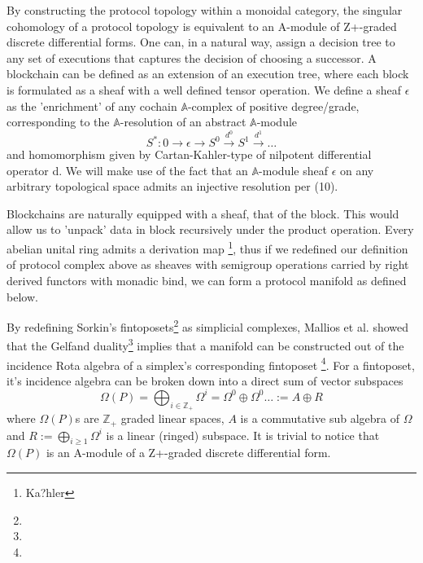 \documentclass{article}
\begin{document}
By constructing the protocol topology within a monoidal category, the singular cohomology of a protocol topology is equivalent to an A-module of Z+-graded discrete differential forms. One can, in a natural way, assign a decision tree to any set of executions that captures the decision of choosing a successor. A blockchain can be defined as an extension of an execution tree, where each block is formulated as a sheaf with a well defined tensor operation. We define a sheaf $\epsilon$ as the 'enrichment' of any cochain $\mathbb{A}$-complex of positive degree/grade, corresponding to the $\mathbb{A}$-resolution of an abstract $\mathbb{A}$-module
\begin{equation} \label{eq1}
S^*: 0 \rightarrow \epsilon \rightarrow S^0 \xrightarrow{d^0} S^1 \xrightarrow{d^1} \dots
\end{equation} \label{eq1}
and homomorphism given by  Cartan-Kahler-type of nilpotent differential operator d. We will make use of the fact that an $\mathbb{A}$-module sheaf $\epsilon$ on any arbitrary topological space admits an injective resolution per (10).

Blockchains are naturally equipped with a sheaf, that of the block.  This would allow us to 'unpack' data in block recursively under the product operation. Every abelian unital ring admits a derivation map \footnote{Ka?hler}, thus if we redefined our definition of protocol complex above as sheaves with semigroup operations carried by right derived functors with monadic bind, we can form a protocol manifold as defined below.

By redefining Sorkin's fintoposets\footnote{} as simplicial complexes, Mallios et al. showed that the Gelfand duality\footnote{} implies that a manifold can be constructed out of the incidence Rota algebra of a simplex's corresponding fintoposet \footnote{}. For a fintoposet, it's incidence algebra can be broken down into a direct sum of vector subspaces
\begin{equation} \label{eq1}
\Omega(P) = \bigoplus_{i \in \mathbb{Z}_+} \Omega^i = \Omega^0 \oplus \Omega^0 \dots := A \oplus R
\end{equation} \label{eq1}
where $\Omega(P)$s are $\mathbb{Z}_+$ graded linear spaces, $A$ is a commutative sub algebra of $\Omega$ and $R := \bigoplus_{i \geq 1} \Omega^i$ is a linear (ringed) subspace. It is trivial to notice that $\Omega(P)$ is an A-module of a Z+-graded discrete differential form. 
\end{document}
